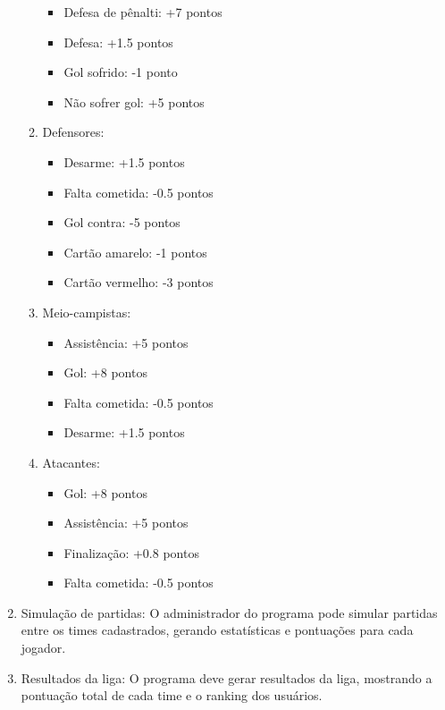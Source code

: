 \documentclass[12pt]{article}
\begin{document}
\begin{enumerate}
\begin{enumerate}
                \begin{itemize}
                  \item Defesa de pênalti: +7 pontos
                  \item Defesa: +1.5 pontos
                  \item Gol sofrido: -1 ponto
                  \item Não sofrer gol: +5 pontos
                \end{itemize}
          \item Defensores:
                \begin{itemize}
                  \item Desarme: +1.5 pontos
                  \item Falta cometida: -0.5 pontos
                  \item Gol contra: -5 pontos
                  \item Cartão amarelo: -1 pontos
                  \item Cartão vermelho: -3 pontos
                \end{itemize}
          \item Meio-campistas:
                \begin{itemize}
                  \item Assistência: +5 pontos
                  \item Gol: +8 pontos
                  \item Falta cometida: -0.5 pontos
                  \item Desarme: +1.5 pontos
                \end{itemize}
          \item Atacantes:
                \begin{itemize}
                  \item Gol: +8 pontos
                  \item Assistência: +5 pontos
                  \item Finalização: +0.8 pontos
                  \item Falta cometida: -0.5 pontos
                \end{itemize}
        \end{enumerate}
  \item Simulação de partidas: O administrador do programa pode simular partidas entre os times cadastrados, gerando estatísticas e pontuações para cada jogador.
  \item Resultados da liga: O programa deve gerar resultados da liga, mostrando a pontuação total de cada time e o ranking dos usuários.
\end{enumerate}
\end{document}
